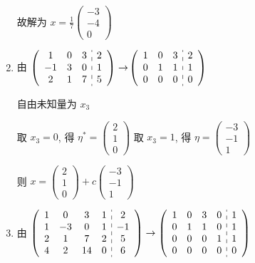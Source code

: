 \begin{enumerate}
			       故解为 \( x = \frac{1}{7}\begin{pmatrix}
				       -3 \\
				       -4 \\
				       0
			       \end{pmatrix} \)
			 \item %
			       由 \( \left(\begin{array}{ccc:c}
					       1  & 0 & 3 & 2 \\
					       -1 & 3 & 0 & 1 \\
					       2  & 1 & 7 & 5
				       \end{array}\right)
			       \to \)\(\left(\begin{array}{ccc:c}
					       1 & 0 & 3 & 2 \\
					       0 & 1 & 1 & 1 \\
					       0 & 0 & 0 & 0
				       \end{array}\right) \)

			       自由未知量为 \( x_{3} \)

			       取 \( x_{3} = 0 \), 得 \( \eta^{*} = \begin{pmatrix}
				       2 \\
				       1 \\
				       0
			       \end{pmatrix} \) 取 \( x_{3} = 1 \), 得 \( \eta = \begin{pmatrix}
				       -3 \\
				       -1 \\
				       1
			       \end{pmatrix} \)

			       则 \( x = \begin{pmatrix}
				       2 \\
				       1 \\
				       0
			       \end{pmatrix} + c\begin{pmatrix}
				       -3 \\
				       -1 \\
				       1
			       \end{pmatrix} \)
			 \item %
			       由 \( \left(\begin{array}{cccc:c}
					       1 & 0  & 3  & 1 & 2  \\
					       1 & -3 & 0  & 1 & -1 \\
					       2 & 1  & 7  & 2 & 5  \\
					       4 & 2  & 14 & 0 & 6
				       \end{array}\right)
			       \to
			       \left(\begin{array}{cccc:c}
					       1 & 0 & 3 & 0 & 1 \\
					       0 & 1 & 1 & 0 & 1 \\
					       0 & 0 & 0 & 1 & 1 \\
					       0 & 0 & 0 & 0 & 0
				       \end{array}\right) \)


\end{enumerate}
